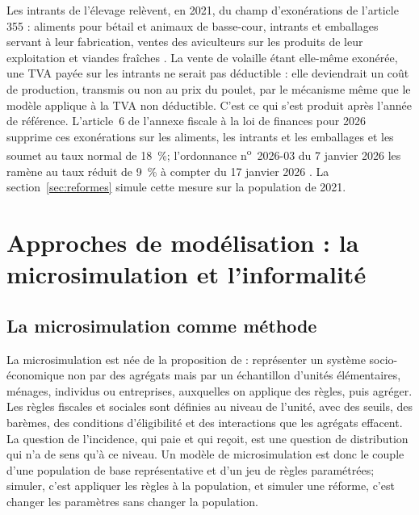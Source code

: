 \documentclass[11pt,a4paper]{article}
\begin{document}
Les intrants de l'élevage relèvent, en 2021, du champ d'exonérations de
l'article 355 : aliments pour bétail et animaux de basse-cour, intrants et
emballages servant à leur fabrication, ventes des aviculteurs sur les produits
de leur exploitation et viandes fraîches \citep{civcgi2021}. La vente de volaille étant elle-même exonérée, une
TVA payée sur les intrants ne serait pas déductible : elle deviendrait un coût
de production, transmis ou non au prix du poulet, par le mécanisme même que le
modèle applique à la TVA non déductible. C'est ce qui s'est produit après
l'année de référence. L'article~6 de l'annexe fiscale à la loi de finances pour
2026 supprime ces exonérations sur les aliments, les intrants et les emballages
et les soumet au taux normal de 18~\%; l'ordonnance n\textsuperscript{o}~2026-03
du 7 janvier 2026 les ramène au taux réduit de 9~\% à compter du 17 janvier
2026 \citep{civlf2026,civord2026,dgi2026}. La section~\ref{sec:reformes} simule
cette mesure sur la population de 2021.

\section{Approches de modélisation : la microsimulation et l'informalité}
\label{sec:litterature}

\subsection{La microsimulation comme méthode}

La microsimulation est née de la proposition de \citet{orcutt1957} :
représenter un système socio-économique non par des agrégats mais par un
échantillon d'unités élémentaires, ménages, individus ou entreprises, auxquelles
on applique des règles, puis agréger. Les règles fiscales et sociales sont
définies au niveau de l'unité, avec des seuils, des barèmes, des conditions
d'éligibilité et des interactions que les agrégats effacent. La question de
l'incidence, qui paie et qui reçoit, est une question de distribution qui n'a de
sens qu'à ce niveau. Un modèle de microsimulation est donc le couple d'une
population de base représentative et d'un jeu de règles paramétrées; simuler,
c'est appliquer les règles à la population, et simuler une réforme, c'est
changer les paramètres sans changer la population.
\end{document}
